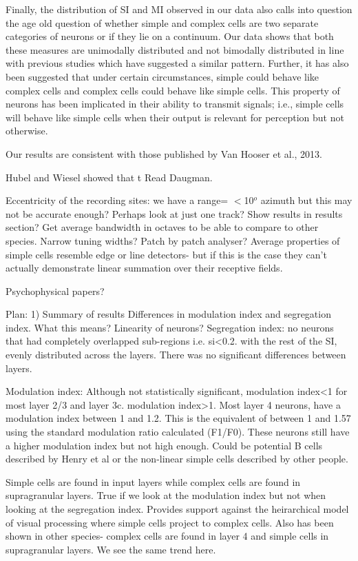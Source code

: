 	Finally, the distribution of SI and MI observed in our data also calls into question the age old question of whether simple and complex cells are two separate categories of neurons or if they lie on a continuum. Our data shows that both these measures are unimodally distributed and not bimodally distributed in line with previous studies which have suggested a similar pattern. Further, it has also been suggested that under certain circumstances, simple could behave like complex cells and complex cells could behave like simple cells. This property of neurons has been implicated in their ability to transmit signals; i.e., simple cells will behave like simple cells when their output is relevant for perception but not otherwise.
	
	Our results are consistent with those published by Van Hooser et al., 2013.
	


	Hubel and Wiesel showed that t
	Read Daugman.
	
	Eccentricity of the recording sites: we have a range= $<$10$^o$ azimuth but this may not be accurate enough? Perhaps look at just one track? Show results in results section? 
	Get average bandwidth in octaves to be able to compare to other species.
	Narrow tuning widths?
	Patch by patch analyser?
	Average properties of simple cells resemble edge or line detectors- but if this is the case they can't actually demonstrate linear summation over their receptive fields.
	
	Psychophysical papers?
	
	
	Plan:
	1) Summary of results
		Differences in modulation index and segregation index. What this means? Linearity of neurons?
		Segregation index: no neurons that had completely overlapped sub-regions i.e. si<0.2.
		with the rest of the SI, evenly distributed across the layers.
		There was no significant differences between layers.

		Modulation index: Although not statistically significant, modulation index<1 for most layer 2/3 and layer 3c. modulation index>1. Most layer 4 neurons, have a modulation index between 1 and 1.2. This is the equivalent of between 1 and 1.57 using the standard modulation ratio calculated (F1/F0). These neurons still have a higher modulation index but not high enough. Could be potential B cells described by Henry et al or the non-linear simple cells described by other people. 
		
		Simple cells are found in input layers while complex cells are found in supragranular layers. True if we look at the modulation index but not when looking at the segregation index. Provides support against the heirarchical model of visual processing where simple cells project to complex cells. Also has been shown in other species- complex cells are found in layer 4 and simple cells in supragranular layers. We see the same trend here.
		
